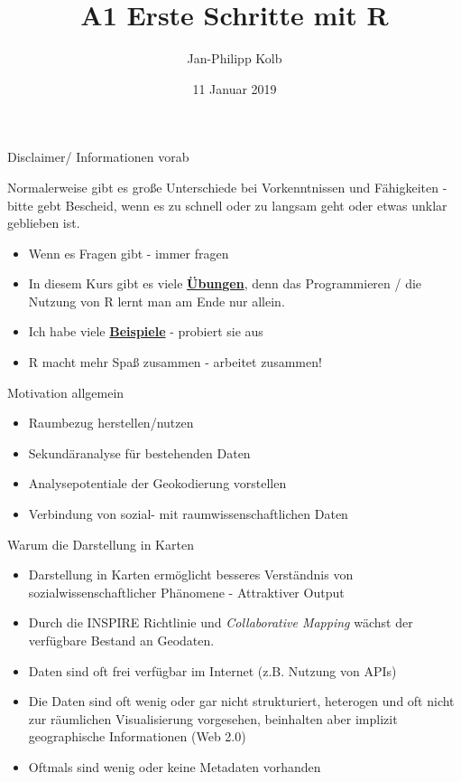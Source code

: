 \documentclass[ignorenonframetext,]{beamer}
\title{A1 Erste Schritte mit R}
\author{Jan-Philipp Kolb}
\date{11 Januar 2019}
\providecommand{\tightlist}{%
  \setlength{\itemsep}{0pt}\setlength{\parskip}{0pt}}
\begin{document}
\frame{\titlepage}

\begin{frame}{Disclaimer/ Informationen vorab}

Normalerweise gibt es große Unterschiede bei Vorkenntnissen und
Fähigkeiten - bitte gebt Bescheid, wenn es zu schnell oder zu langsam
geht oder etwas unklar geblieben ist.

\begin{itemize}
\tightlist
\item
  Wenn es Fragen gibt - immer fragen
\item
  In diesem Kurs gibt es viele
  \href{http://web.math.ku.dk/~helle/R-intro/exercises.pdf}{\textbf{Übungen}},
  denn das Programmieren / die Nutzung von R lernt man am Ende nur
  allein.
\item
  Ich habe viele \href{https://www.showmeshiny.com/}{\textbf{Beispiele}}
  - probiert sie aus
\item
  R macht mehr Spaß zusammen - arbeitet zusammen!
\end{itemize}

\begin{block}{Motivation allgemein}

\begin{itemize}
\tightlist
\item
  Raumbezug herstellen/nutzen
\item
  Sekundäranalyse für bestehenden Daten
\item
  Analysepotentiale der Geokodierung vorstellen
\item
  Verbindung von sozial- mit raumwissenschaftlichen Daten
\end{itemize}

\end{block}

\begin{block}{Warum die Darstellung in Karten}

\begin{itemize}
\item
  Darstellung in Karten ermöglicht besseres Verständnis von
  sozialwissenschaftlicher Phänomene - Attraktiver Output
\item
  Durch die INSPIRE Richtlinie und \emph{Collaborative Mapping} wächst
  der verfügbare Bestand an Geodaten.
\item
  Daten sind oft frei verfügbar im Internet (z.B. Nutzung von APIs)
\item
  Die Daten sind oft wenig oder gar nicht strukturiert, heterogen und
  oft nicht zur räumlichen Visualisierung vorgesehen, beinhalten aber
  implizit geographische Informationen (Web 2.0)
\item
  Oftmals sind wenig oder keine Metadaten vorhanden
\end{itemize}

\end{block}

\end{frame}
\end{document}
